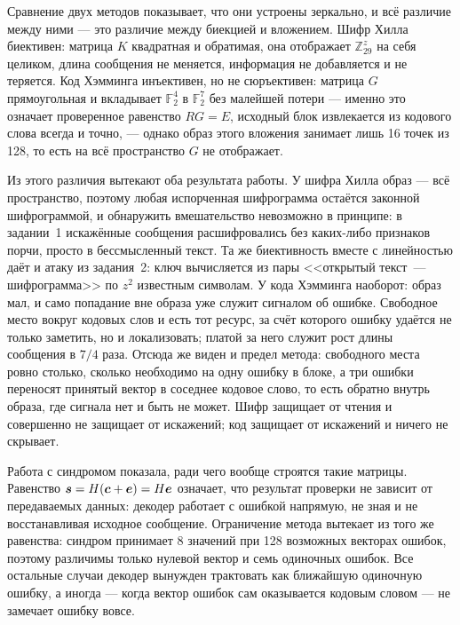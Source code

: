 \documentclass[a4paper,14pt]{extarticle}
\begin{document}
Сравнение двух методов показывает, что они устроены зеркально, и всё различие между
ними --- это различие между биекцией и вложением. Шифр Хилла биективен: матрица $K$
квадратная и обратимая, она отображает $\mathbb{Z}_{29}^z$ на себя целиком, длина
сообщения не меняется, информация не добавляется и не теряется. Код Хэмминга
инъективен, но не сюръективен: матрица $G$ прямоугольная и вкладывает $\mathbb{F}_2^4$
в $\mathbb{F}_2^7$ без малейшей потери --- именно это означает проверенное равенство
$RG = E$, исходный блок извлекается из кодового слова всегда и точно, --- однако образ
этого вложения занимает лишь 16 точек из 128, то есть на всё пространство $G$ не
отображает.

Из этого различия вытекают оба результата работы. У шифра Хилла образ --- всё
пространство, поэтому любая испорченная шифрограмма остаётся законной шифрограммой, и
обнаружить вмешательство невозможно в принципе: в задании~1 искажённые сообщения
расшифровались без каких-либо признаков порчи, просто в бессмысленный текст. Та же
биективность вместе с линейностью даёт и атаку из задания~2: ключ вычисляется из пары
<<открытый текст~--- шифрограмма>> по $z^2$ известным символам. У кода Хэмминга
наоборот: образ мал, и само попадание вне образа уже служит сигналом об ошибке.
Свободное место вокруг кодовых слов и есть тот ресурс, за счёт которого ошибку удаётся
не только заметить, но и локализовать; платой за него служит рост длины сообщения в
$7/4$ раза. Отсюда же виден и предел метода: свободного места ровно столько, сколько
необходимо на одну ошибку в блоке, а три ошибки переносят принятый вектор в соседнее
кодовое слово, то есть обратно внутрь образа, где сигнала нет и быть не может. Шифр
защищает от чтения и совершенно не защищает от искажений; код защищает от искажений и
ничего не скрывает.

Работа с синдромом показала, ради чего вообще строятся такие матрицы. Равенство
$\boldsymbol{s} = H(\boldsymbol{c} + \boldsymbol{e}) = H\boldsymbol{e}$ означает, что результат проверки не
зависит от передаваемых данных: декодер работает с ошибкой напрямую, не зная и не
восстанавливая исходное сообщение. Ограничение метода вытекает из того же равенства:
синдром принимает 8 значений при 128 возможных векторах ошибок, поэтому различимы
только нулевой вектор и семь одиночных ошибок. Все остальные случаи декодер вынужден
трактовать как ближайшую одиночную ошибку, а иногда --- когда вектор ошибок сам
оказывается кодовым словом --- не замечает ошибку вовсе.

\newpage
{}








\end{document}
